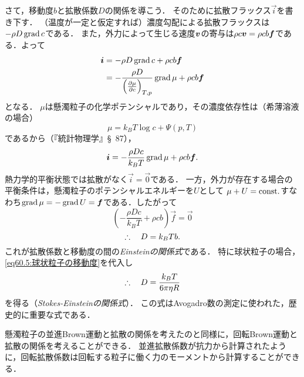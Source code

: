 さて，移動度$b$と拡散係数$D$の関係を導こう．
そのために拡散フラックス$\vec{i}$を書き下す．
（温度が一定と仮定すれば）濃度勾配による拡散フラックスは$-\rho D \operatorname{grad} c$である．
また，外力によって生じる速度$\vb*{v}$の寄与は$\rho c\vb*{v} = \rho cb \vb*{f}$である．よって
\begin{align}
    \vec{i} &= -\rho D \Grad c + \rho cb \vec{f} \\
    &= - \frac{\rho D}{\PDV{\mu}{c}{T,p}} \Grad \mu + \rho cb \vec{f} \nonumber
\end{align}
となる．
$\mu$は懸濁粒子の化学ポテンシャルであり，その濃度依存性は（希薄溶液の場合）
\[
    \mu = k_B T \log c + \varPsi(p,T)
\]
であるから（『統計物理学』\S~87），
\[
    \vb*{i} = - \frac{\rho Dc}{k_BT} \operatorname{grad} \mu + \rho cb \vb*{f}.
\]
熱力学的平衡状態では拡散がなく$\vec{i}=\vec{0}$である．
一方，外力が存在する場合の平衡条件は，懸濁粒子のポテンシャルエネルギーを$U$として
$\mu+U=\mathrm{const.}$すなわち$\operatorname{grad}\mu=-\operatorname{grad} U = \vb*{f}$である．したがって
\[
    \left( - \frac{\rho Dc}{k_BT} + \rho cb \right) \vec{f} = \vec{0}
\]
\begin{equation}
    \therefore\quad D = k_BT b.
\end{equation}
これが拡散係数と移動度の間の\emph{Einsteinの関係式}である．
特に球状粒子の場合，\eqref{eq60.5:球状粒子の移動度}を代入し
\begin{equation}\label{eq60.9:Stokes-Einsteinの関係式}
    \therefore\quad D = \frac{k_BT}{6\pi\eta R}
\end{equation}
を得る（\emph{Stokes-Einsteinの関係式}）．
この式はAvogadro数の測定に使われた，歴史的に重要な式である．


懸濁粒子の並進Brown運動と拡散の関係を考えたのと同様に，回転Brown運動と拡散の関係を考えることができる．
並進拡散係数が抗力から計算されたように，回転拡散係数は回転する粒子に働く力のモーメントから計算することができる．





